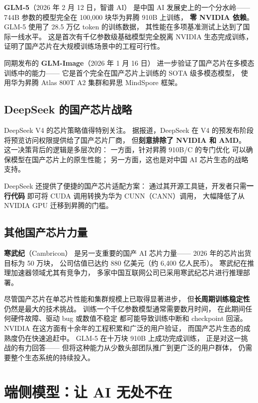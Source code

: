 \textbf{GLM-5}（2026 年 2 月 12 日，智谱 AI）
是中国 AI 发展史上的一个分水岭——
744B 参数的模型完全在 100,000 块华为昇腾 910B 上训练，
\textbf{零 NVIDIA 依赖}。
GLM-5 使用了 28.5 万亿 token 的训练数据，
其性能在多项基准测试上达到了国际一线水平。
这是首次有千亿参数级基础模型完全脱离 NVIDIA 生态完成训练，
证明了国产芯片在大规模训练场景中的工程可行性。

同期发布的 \textbf{GLM-Image}（2026 年 1 月 16 日）
进一步验证了国产芯片在多模态训练中的能力——
它是首个完全在国产芯片上训练的 SOTA 级多模态模型，
使用华为昇腾 Atlas 800T A2 集群和昇思 MindSpore 框架。

\subsection{DeepSeek 的国产芯片战略}

DeepSeek V4 的芯片策略值得特别关注。
据报道，DeepSeek 在 V4 的预发布阶段
将预览访问权限提供给了国产芯片厂商，
但\textbf{刻意排除了 NVIDIA 和 AMD}。
这一决策背后的逻辑是多层次的：
一方面，针对昇腾 910B/C 的专门优化
可以确保模型在国产芯片上的原生性能；
另一方面，这也是对中国 AI 芯片生态的战略支持。

DeepSeek 还提供了便捷的国产芯片适配方案：
通过其开源工具链，开发者只需\textbf{一行代码}
即可将 CUDA 调用转换为华为 CUNN（CANN）调用，
大幅降低了从 NVIDIA GPU 迁移到昇腾的门槛。

\subsection{其他国产芯片力量}

\textbf{寒武纪}（Cambricon）
是另一支重要的国产 AI 芯片力量——
2026 年的芯片出货目标为 50 万块，
公司估值已达约 880 亿美元（约 6,400 亿人民币）。
寒武纪在推理加速器领域尤其有竞争力，
多家中国互联网公司已采用寒武纪芯片进行推理部署。

\begin{warnbox}
尽管国产芯片在单芯片性能和集群规模上已取得显著进步，
但\textbf{长周期训练稳定性}仍然是最大的技术挑战。
训练一个千亿参数模型通常需要数月时间，
在此期间任何硬件故障、驱动 bug 或数值不稳定
都可能导致训练中断和 checkpoint 回滚。
NVIDIA 在这方面有十余年的工程积累和广泛的用户验证，
而国产芯片生态的成熟度仍在快速追赶中。
GLM-5 在十万块 910B 上成功完成训练，
正是对这一挑战的有力回答——
但将这种能力从少数头部团队推广到更广泛的用户群体，
仍需要整个生态系统的持续投入。
\end{warnbox}

\section{端侧模型：让 AI 无处不在}

